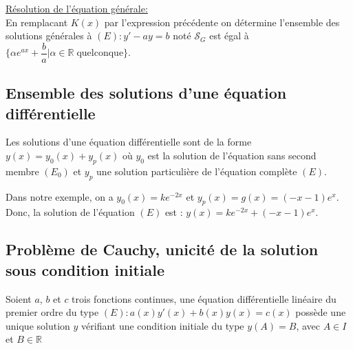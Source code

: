 \documentclass[french]{book}
\newcommand{\cals}{\mathscr{S}}
\begin{document}
\underline{Résolution de l'équation générale:}\\

En remplacant $K(x)$ par l'expression précédente on détermine  l'ensemble des solutions générales à $(E): y'-ay=b $ noté $\cals_G$ est égal à $\{ \alpha e^{ax} + \dfrac{b}{a}   \vert  \alpha \in \mathbb{R} \; \text{quelconque} \}$.

 

 






\subsection{Ensemble des solutions d'une équation différentielle}

\begin{thm}
Les solutions d'une équation différentielle sont de la forme $y(x)=y_0(x)+y_p(x)$ où $y_0$ est la solution de l'équation sans second membre $(E_0)$ et $y_p$ une solution particulière de l'équation complète $(E)$.
\end{thm}

\begin{exemple}
Dans notre exemple, on a $y_0(x)=ke^{-2x}$ et $y_p(x)=g(x)=(-x-1)e^x$. \\
Donc, la solution de l'équation $(E)$ est : $y(x)=ke^{-2x}+(-x-1)e^x$.
\end{exemple}



\subsection{Problème de Cauchy, unicité de la solution sous condition initiale}

\begin{thm}
Soient $a$, $b$ et $c$ trois fonctions continues, une équation différentielle linéaire du premier ordre du type $(E):a(x)y'(x)+b(x)y(x) =c(x)$ possède une unique solution $y$ vérifiant une condition initiale du type $y(A)=B$, avec $A \in I$ et $B\in \mathbb{R}$
\end{thm}
\end{document}
